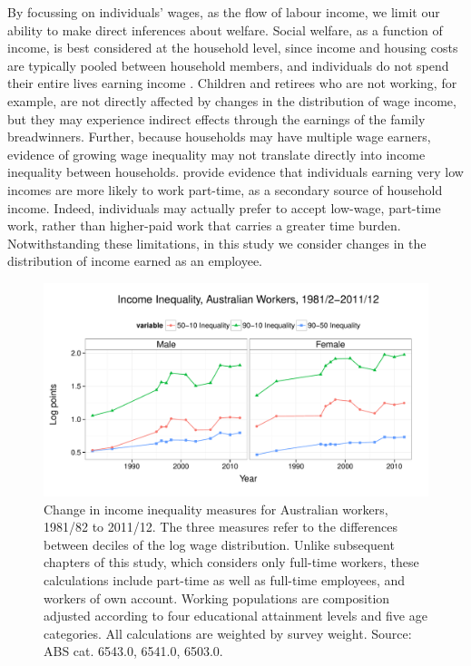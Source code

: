 
By focussing on individuals' wages, as the flow of labour income, we limit our ability to make direct inferences about welfare. Social welfare, as a function of income, is best considered at the household level, since income and housing costs are typically pooled between household members, and individuals do not spend their entire lives earning income \citep{Richardson1999,Borland1999}. Children and retirees who are not working, for example, are not directly affected by changes in the distribution of wage income, but they may experience indirect effects through the earnings of the family breadwinners. Further, because households may have multiple wage earners, evidence of growing wage inequality may not translate directly into income inequality between households. \citet{Richardson1999} provide evidence that individuals earning very low incomes are more likely to work part-time, as a secondary source of household income. Indeed, individuals may actually prefer to accept low-wage, part-time work, rather than higher-paid work that carries a greater time burden. Notwithstanding these limitations, in this study we consider changes in the distribution of income earned as an employee.

\begin{figure}[h]
  \centering
  \includegraphics[width=\textwidth]{../figure/ineq_time.pdf}
  \caption{Change in income inequality measures for Australian workers, 1981/82 to 2011/12. The three measures refer to the differences between deciles of the log wage distribution. Unlike subsequent chapters of this study, which considers only full-time workers, these calculations include part-time as well as full-time employees, and workers of own account. Working populations are composition adjusted according to four educational attainment levels and five age categories. All calculations are weighted by survey weight. Source: ABS cat. 6543.0, 6541.0, 6503.0.}
\end{figure}

